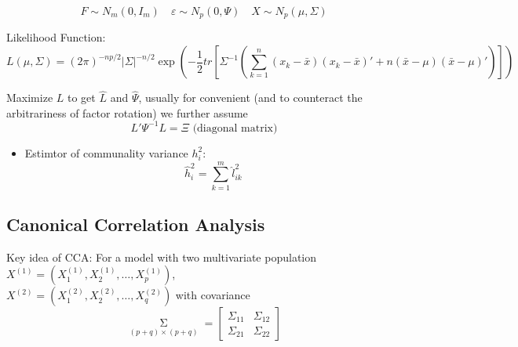     \begin{equation}
        F\sim N_m(0,I_m)\quad \varepsilon \sim N_p(0,\Psi )\quad X\sim N_p(\mu,\Sigma ) 
    \end{equation}

    Likelihood Function:
    \begin{equation}
        L(\mu ,\Sigma ) =(2\pi)^{-np/2}|\Sigma |^{-n/2}\exp\left( -\dfrac{1}{2}tr\left[ \Sigma ^{-1}\left( \sum_{k=1}^n(x_k-\bar{x})(x_k-\bar{x})'+n(\bar{x}-\mu)(\bar{x}-\mu)' \right) \right] \right)
    \end{equation}

    Maximize $ L $ to get $ \hat{L}  $ and $ \hat{\Psi } $, usually for convenient (and to counteract the arbitrariness of factor rotation) we further assume
    \begin{equation}
        L'\Psi ^{-1}L=\varXi \text{ (diagonal matrix)} 
    \end{equation}
    
    \begin{itemize}[topsep=2pt,itemsep=2pt]
        \item Estimtor of communality variance $ h_i^2 $:
        \begin{equation}
            \hat{h}_i^2=\sum_{k=1}^m \hat{l}_{ik}^2 
        \end{equation}
        
        
    \end{itemize}
    
        
    
    
    
    











\subsection{Canonical Correlation Analysis}
    Key idea of CCA: For a model with two multivariate population $ X^{(1)}=(X^{(1)}_{1},X^{(1)}_{2},\ldots,X^{(1)}_{p})  $, \\$ X^{(2)}=(X^{(2)}_{1},X^{(2)}_{2},\ldots,X^{(2)}_{q})  $ with covariance
    \begin{equation}
        \mathop{\Sigma }\limits_{(p+q)\times (p+q)}  =\begin{bmatrix}
            \Sigma _{11}&\Sigma _{12}\\
            \Sigma _{21}&\Sigma _{22}
        \end{bmatrix} 
    \end{equation}
    

